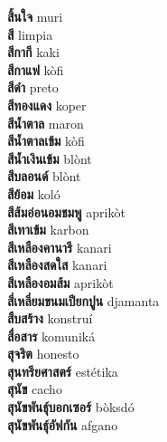 \textbf{ สิ้นใจ  } muri \\
\textbf{ สี  } limpia \\
\textbf{ สีกากี  } kaki \\
\textbf{ สีกาแฟ  } kòfi \\
\textbf{ สีดำ  } preto \\
\textbf{ สีทองแดง  } koper \\
\textbf{ สีน้ำตาล  } maron \\
\textbf{ สีน้ำตาลเข้ม  } kòfi \\
\textbf{ สีน้ำเงินเข้ม  } blònt \\
\textbf{ สีบลอนด์  } blònt \\
\textbf{ สีย้อม  } koló \\
\textbf{ สีส้มอ่อนอมชมพู  } aprikòt \\
\textbf{ สีเทาเข้ม  } karbon \\
\textbf{ สีเหลืองคานารี  } kanari \\
\textbf{ สีเหลืองสดใส  } kanari \\
\textbf{ สีเหลืองอมส้ม  } aprikòt \\
\textbf{ สี่เหลี่ยมขนมเปียกปูน  } djamanta \\
\textbf{ สืบสร้าง  } konstruí \\
\textbf{ สื่อสาร  } komuniká \\
\textbf{ สุจริต  } honesto \\
\textbf{ สุนทรียศาสตร์  } estétika \\
\textbf{ สุนัข  } cacho \\
\textbf{ สุนัขพันธุ์บอกเซอร์  } bòksdó \\
\textbf{ สุนัขพันธุ์อัฟกัน  } afgano \\
